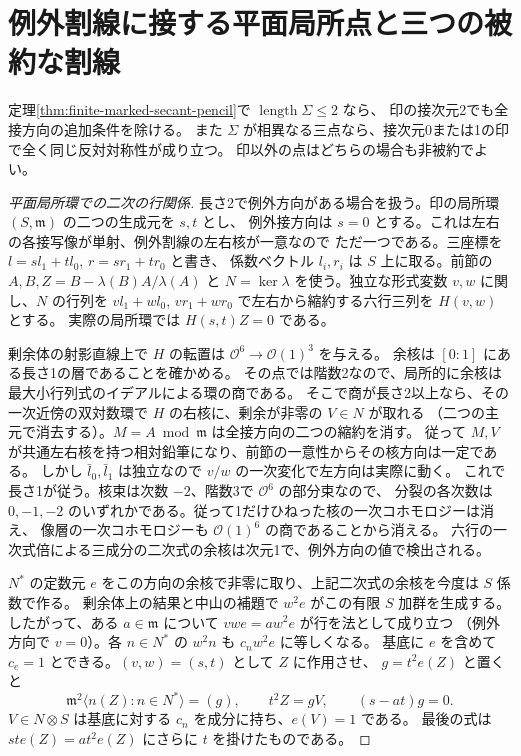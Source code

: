 \section{例外割線に接する平面局所点と三つの被約な割線}
\label{sec:finite-marked-tangent-secants}
\begin{theorem}\label{thm:finite-marked-tangent-secants}
定理\ref{thm:finite-marked-secant-pencil}で $\operatorname{length}\Sigma\le2$ なら、
印の接次元2でも全接方向の追加条件を除ける。
また $\Sigma$ が相異なる三点なら、接次元0または1の印で全く同じ反対対称性が成り立つ。
印以外の点はどちらの場合も非被約でよい。
\end{theorem}
\begin{proof}[平面局所環での二次の行関係]
長さ2で例外方向がある場合を扱う。印の局所環 $(S,\mathfrak m)$ の二つの生成元を $s,t$ とし、
例外接方向は $s=0$ とする。これは左右の各接写像が単射、例外割線の左右核が一意なので
ただ一つである。三座標を $l=s l_1+t l_0$, $r=s r_1+t r_0$ と書き、
係数ベクトル $l_i,r_i$ は $S$ 上に取る。前節の $A,B,Z=B-\lambda(B)A/\lambda(A)$ と
$N=\ker\lambda$ を使う。独立な形式変数 $v,w$ に関し、$N$ の行列を
$v l_1+w l_0$, $v r_1+w r_0$ で左右から縮約する六行三列を $H(v,w)$ とする。
実際の局所環では $H(s,t)Z=0$ である。

剰余体の射影直線上で $H$ の転置は $\mathcal O^6\to\mathcal O(1)^3$ を与える。
余核は $[0:1]$ にある長さ1の層であることを確かめる。
その点では階数2なので、局所的に余核は最大小行列式のイデアルによる環の商である。
そこで商が長さ2以上なら、その一次近傍の双対数環で $H$ の右核に、剰余が非零の $V\in N$ が取れる
（二つの主元で消去する）。$M=A\bmod\mathfrak m$ は全接方向の二つの縮約を消す。
従って $M,V$ が共通左右核を持つ相対鉛筆になり、前節の一意性からその核方向は一定である。
しかし $\bar l_0,\bar l_1$ は独立なので $v/w$ の一次変化で左方向は実際に動く。
これで長さ1が従う。核束は次数 $-2$、階数3で $\mathcal O^6$ の部分束なので、
分裂の各次数は $0,-1,-2$ のいずれかである。従って1だけひねった核の一次コホモロジーは消え、
像層の一次コホモロジーも $\mathcal O(1)^6$ の商であることから消える。
六行の一次式倍による三成分の二次式の余核は次元1で、例外方向の値で検出される。

$N^*$ の定数元 $e$ をこの方向の余核で非零に取り、上記二次式の余核を今度は $S$ 係数で作る。
剰余体上の結果と中山の補題で $w^2e$ がこの有限 $S$ 加群を生成する。
したがって、ある $a\in\mathfrak m$ について $vwe=a w^2 e$ が行を法として成り立つ
（例外方向で $v=0$）。各 $n\in N^*$ の $w^2 n$ も $c_n w^2 e$ に等しくなる。
基底に $e$ を含めて $c_e=1$ とできる。$(v,w)=(s,t)$ として $Z$ に作用させ、
$g=t^2 e(Z)$ と置くと
\[
 \mathfrak m^2\langle n(Z):n\in N^*\rangle=(g),\qquad
 t^2 Z=g V,\qquad (s-at)g=0.
\]
$V\in N\otimes S$ は基底に対する $c_n$ を成分に持ち、$e(V)=1$ である。
最後の式は $st e(Z)=a t^2e(Z)$ にさらに $t$ を掛けたものである。


\end{proof}
